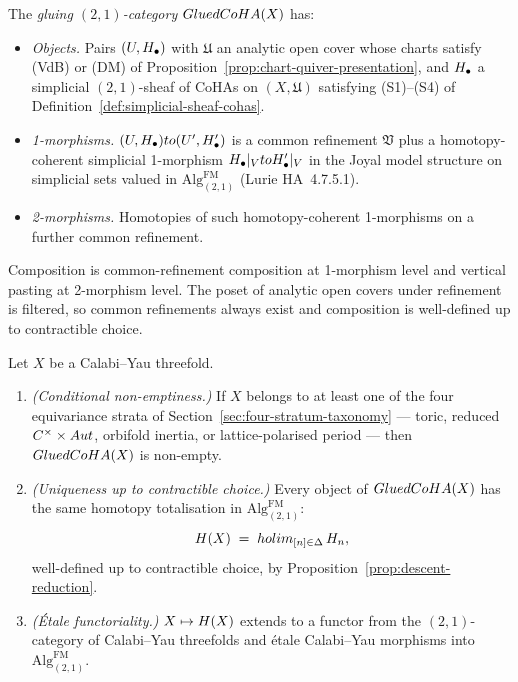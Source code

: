 \begin{definition}
\label{def:glue-2cat}
\ClaimStatusDefinition
The \emph{gluing $(2,1)$-category} $GluedCoHA(X)$ has:
\begin{itemize}
\item \emph{Objects.} Pairs $(U, H_\bullet)$ with
  $\mathfrak{U}$ an analytic open cover whose charts satisfy (VdB)
  or (DM) of Proposition~\ref{prop:chart-quiver-presentation}, and
  $H_\bullet$ a simplicial $(2,1)$-sheaf of CoHAs on
  $(X, \mathfrak{U})$ satisfying (S1)--(S4) of
  Definition~\ref{def:simplicial-sheaf-cohas}.
\item \emph{1-morphisms.}
  $(U, H_\bullet) to (U', H'_\bullet)$
  is a common refinement $\mathfrak{V}$ plus a homotopy-coherent
  simplicial 1-morphism
  $H_\bullet|_{V} to H'_\bullet|_{V}$ in
  the Joyal model structure on simplicial sets valued in
  $\mathrm{Alg}^{\mathrm{FM}}_{(2,1)}$ (Lurie HA~4.7.5.1).
\item \emph{2-morphisms.} Homotopies of such homotopy-coherent
  1-morphisms on a further common refinement.
\end{itemize}
Composition is common-refinement composition at 1-morphism level
and vertical pasting at 2-morphism level. The poset of analytic
open covers under refinement is filtered, so common refinements
always exist and composition is well-defined up to contractible
choice.
\end{definition}

\begin{theorem}
\label{thm:global-coha-limit}
\ClaimStatusProposition
Let $X$ be a Calabi--Yau threefold.
\begin{enumerate}
\item \emph{(Conditional non-emptiness.)} If $X$ belongs to at
  least one of the four equivariance strata of
  Section~\ref{sec:four-stratum-taxonomy} --- toric, reduced
  $C^\times \times Aut$, orbifold inertia, or lattice-polarised
  period --- then $GluedCoHA(X)$ is non-empty.
\item \emph{(Uniqueness up to contractible choice.)} Every object
  of $GluedCoHA(X)$ has the same homotopy totalisation in
  $\mathrm{Alg}^{\mathrm{FM}}_{(2,1)}$:
  \[
    H(X) \;=\; holim_{[n] \in \Delta}\, H_n,
  \]
  well-defined up to contractible choice, by
  Proposition~\ref{prop:descent-reduction}.
\item \emph{(Étale functoriality.)} $X \mapsto H(X)$ extends to
  a functor from the $(2,1)$-category of Calabi--Yau threefolds
  and étale Calabi--Yau morphisms into
  $\mathrm{Alg}^{\mathrm{FM}}_{(2,1)}$.
\end{enumerate}
\end{theorem}

